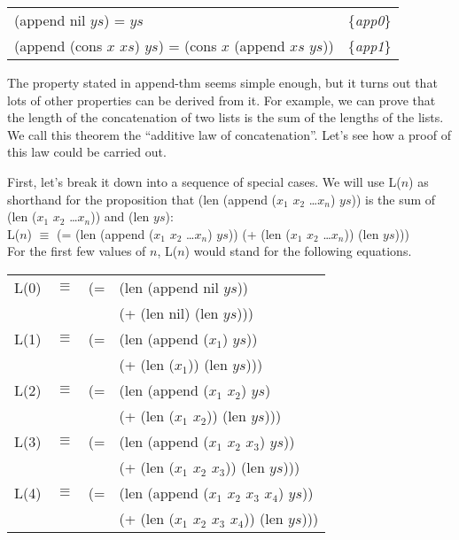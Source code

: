 \label{append-equations}
\begin{center}
\begin{tabular}{ll}
(append nil $ys$) =  $ys$                                     & \{\emph{app0}\} \\
(append (cons $x$ $xs$) $ys$) = (cons $x$ (append $xs$ $ys$)) & \{\emph{app1}\}
\end{tabular}
\end{center}

The property stated in append-thm seems simple enough, but it turns out that lots of other properties can be derived from it. For example, we can prove that the length of the concatenation of two lists is the sum of the lengths of the lists. We call this theorem the ``additive law of concatenation''. Let's see how a proof of this law could be carried out.

First, let's break it down into a sequence of special cases. We will use L($n$) as shorthand for the proposition that (len (append ($x_1$ $x_2$ \dots $x_n$) $ys$)) is the sum of (len ($x_1$ $x_2$ \dots $x_n$)) and (len $ys$): \\
L($n$) $\equiv$ (= (len (append ($x_1$ $x_2$ \dots $x_n$) $ys$))
                   (+ (len ($x_1$ $x_2$ \dots $x_n$)) (len $ys$)))
\\
For the first few values of $n$, L($n$) would stand for the following equations.



\begin{center}
\begin{tabular}{llll}
L(0) & $\equiv$ & (= &(len (append nil $ys$)) \\
     &          &    &(+ (len nil) (len $ys$))) \\
L(1) & $\equiv$ & (= &(len (append ($x_1$) $ys$)) \\
     &          &    &(+ (len ($x_1$)) (len $ys$))) \\
L(2) & $\equiv$ & (= &(len (append ($x_1$ $x_2$) $ys$) 	\\
	 &          &    &(+ (len ($x_1$ $x_2$)) (len $ys$))) \\
L(3) & $\equiv$ & (= &(len (append ($x_1$ $x_2$ $x_3$) $ys$)) \\
     &          &    &(+ (len ($x_1$ $x_2$ $x_3$)) (len $ys$))) \\
L(4) & $\equiv$ & (= &(len (append ($x_1$ $x_2$ $x_3$ $x_4$) $ys$)) \\
     &          &    &(+ (len ($x_1$ $x_2$ $x_3$ $x_4$)) (len $ys$)))
\end{tabular}
\end{center}

